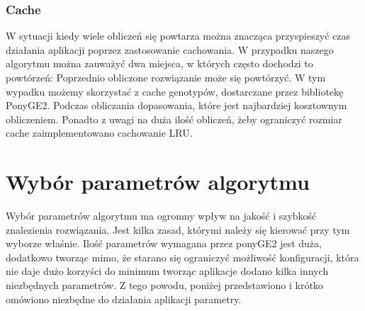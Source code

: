 \subsubsection{Cache}

W sytuacji kiedy wiele obliczeń się powtarza można znacząca przyspieszyć czas działania aplikacji poprzez zastosowanie cachowania. W przypadku naszego algorytmu można zauważyć dwa miejsca, w których często dochodzi to powtórzeń:
Poprzednio obliczone rozwiązanie może się powtórzyć. W tym wypadku możemy skorzystać z cache genotypów, dostarczane przez bibliotekę PonyGE2.
Podczas obliczania dopasowania, które jest najbardziej kosztownym obliczeniem. Ponadto z uwagi na duża ilość obliczeń, żeby ograniczyć rozmiar cache zaimplementowano cachowanie LRU.
\section{Wybór parametrów algorytmu}
Wybór parametrów algorytmu ma ogromny wpływ na jakość i szybkość znalezienia rozwiązania. Jest kilka zasad, którymi należy się kierować przy tym wyborze właśnie. Ilość parametrów wymagana przez ponyGE2 jest duża, dodatkowo tworząc mimo, że starano się ograniczyć możliwość konfiguracji, która nie daje dużo korzyści do minimum tworząc aplikacje dodano kilka innych niezbędnych parametrów. Z tego powodu, poniżej przedstawiono i krótko omówiono niezbędne do działania aplikacji parametry.

